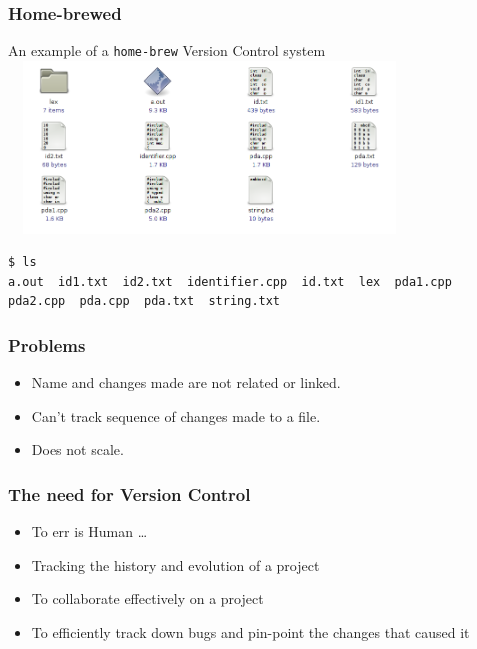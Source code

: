 \documentclass[14pt,compress]{beamer}
\newcommand{\typ}[1]{\lstinline{#1}}
\begin{document}
\begin{frame}[fragile]
  \frametitle{Home-brewed}
  \begin{center}
    An example of a \typ{home-brew} Version Control system
    \includegraphics[height=1.8in,width=4.2in]{images/folder.png}
  \end{center}
  \begin{lstlisting}
$ ls
a.out  id1.txt  id2.txt  identifier.cpp  id.txt  lex  pda1.cpp  pda2.cpp  pda.cpp  pda.txt  string.txt
  \end{lstlisting} %
\end{frame}

\begin{frame}[fragile]
  \frametitle{Problems}
  \begin{block}{}
  \begin{itemize}
  \item Name and changes made are not related or linked.
  \item Can't track sequence of changes made to a file.
  \item Does not scale.
  \end{itemize}
    \end{block}
\end{frame}

\begin{frame}[fragile]
  \frametitle{The need for Version Control}
  \begin{itemize}
  \item \alert{To err is Human} \ldots
  \item Tracking the history and evolution of a project
  \item To collaborate effectively on a project
  \item To efficiently track down bugs and pin-point the changes that
    caused it
  \end{itemize}
\end{frame}
\end{document}
